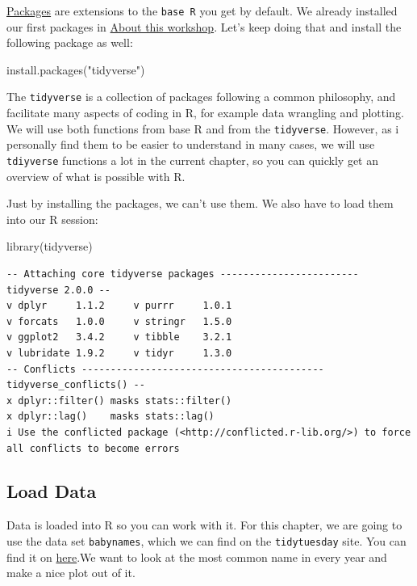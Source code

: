 \documentclass[
  letterpaper,
  DIV=11,
  numbers=noendperiod]{scrartcl}
\newenvironment{Shaded}{\begin{snugshade}}{\end{snugshade}}
\newcommand{\FunctionTok}[1]{\textcolor[rgb]{0.28,0.35,0.67}{#1}}
\newcommand{\NormalTok}[1]{\textcolor[rgb]{0.00,0.23,0.31}{#1}}
\newcommand{\StringTok}[1]{\textcolor[rgb]{0.13,0.47,0.30}{#1}}
\begin{document}
\href{packages.qmd}{Packages} are extensions to the \texttt{base\ R} you
get by default. We already installed our first packages in
\href{setup.qmd\#about-this-workshop}{About this workshop}. Let's keep
doing that and install the following package as well:

\begin{Shaded}
\begin{Highlighting}[]
\FunctionTok{install.packages}\NormalTok{(}\StringTok{"tidyverse"}\NormalTok{)}
\end{Highlighting}
\end{Shaded}

The \texttt{tidyverse} is a collection of packages following a common
philosophy, and facilitate many aspects of coding in R, for example data
wrangling and plotting. We will use both functions from base R and from
the \texttt{tidyverse}. However, as i personally find them to be easier
to understand in many cases, we will use \texttt{tdiyverse} functions a
lot in the current chapter, so you can quickly get an overview of what
is possible with R.

Just by installing the packages, we can't use them. We also have to load
them into our R session:

\begin{Shaded}
\begin{Highlighting}[]
\FunctionTok{library}\NormalTok{(tidyverse)}
\end{Highlighting}
\end{Shaded}

\begin{verbatim}
-- Attaching core tidyverse packages ------------------------ tidyverse 2.0.0 --
v dplyr     1.1.2     v purrr     1.0.1
v forcats   1.0.0     v stringr   1.5.0
v ggplot2   3.4.2     v tibble    3.2.1
v lubridate 1.9.2     v tidyr     1.3.0
-- Conflicts ------------------------------------------ tidyverse_conflicts() --
x dplyr::filter() masks stats::filter()
x dplyr::lag()    masks stats::lag()
i Use the conflicted package (<http://conflicted.r-lib.org/>) to force all conflicts to become errors
\end{verbatim}

\hypertarget{load-data}{%
\subsection{Load Data}\label{load-data}}

Data is loaded into R so you can work with it. For this chapter, we are
going to use the data set \texttt{babynames}, which we can find on the
\texttt{tidytuesday} site. You can find it on
\href{https://github.com/nickhaf/r_tutorial/tree/main/raw_data}{here}.We
want to look at the most common name in every year and make a nice plot
out of it.
\end{document}

